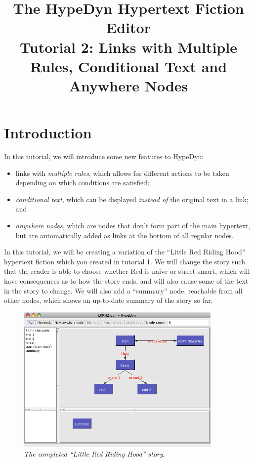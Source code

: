 \documentclass{article}
\begin{document}
\title{The HypeDyn Hypertext Fiction Editor\\Tutorial 2: Links with Multiple
Rules, Conditional Text and Anywhere Nodes}
\date{}

\onecolumn
\maketitle

\tableofcontents


\section{Introduction}
In this tutorial, we will introduce some new features to HypeDyn:

\begin{itemize}
  \item links with \textit{multiple rules}, which allows for different actions
  to be taken depending on which conditions are satisfied;
  \item \textit{conditional text}, which can be displayed \textit{instead of}
  the original text in a link; and
  \item \textit{anywhere nodes}, which are nodes that don't form part of the
  main hypertext, but are automatically added as links at the bottom of all regular
  nodes.
\end{itemize}

In this tutorial, we will be creating a variation of the ``Little Red Riding
Hood'' hypertext fiction which you created in tutorial 1. We will change the
story such that the reader is able to choose whether Red is naive or
street-smart, which will have consequences as to how the story ends, and will
also cause some of the text in the story to change. We will also add a
``summary'' node, reachable from all other nodes, which shows an up-to-date
summary of the story so far.


\begin{figure}[h]
  \centering
  \includegraphics[width=10cm]{images/hypedyn-tutorial-2-figure-1}
  \caption{\textit{The completed ``Little Red Riding Hood'' story.}}
  \label{fig:tut2:completed}
\end{figure} 
\end{document}
